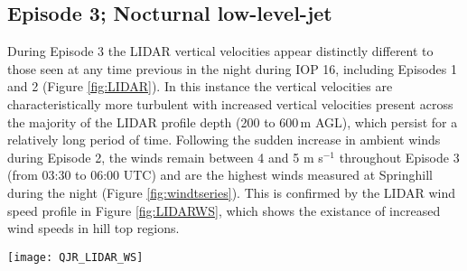\documentclass[times]{qjrms4}
\begin{document}
%
%

\subsection{Episode 3; Nocturnal low-level-jet}
\label{ep3}
During Episode 3 the LIDAR vertical velocities appear distinctly different to those seen at any time previous in the night during IOP 16, including Episodes 1 and 2 (Figure \ref{fig:LIDAR}). In this instance the vertical velocities are characteristically more turbulent with increased vertical velocities present across the majority of the LIDAR profile depth (200 to 600$\,\mbox{m}$ AGL), which  persist for a relatively long period of time. Following the sudden increase in ambient winds during Episode 2, the winds remain between 4 and 5 m s$^{-1}$ throughout Episode 3 (from 03:30 to 06:00 UTC) and are the highest winds measured at Springhill during the night (Figure \ref{fig:windtseries}). This is confirmed by the LIDAR wind speed profile in Figure \ref{fig:LIDARWS}, which shows the existance of increased wind speeds in hill top regions.

       \begin{figure*}
        \centering
        \texttt{[image: QJR\_LIDAR\_WS]}
        \caption{Time series of NCAS LIDAR measurements of wind speed taken at Duffryn. Dashed line indicates local hill tops.}
        \label{fig:LIDARWS}
        \end{figure*}
\end{document}
